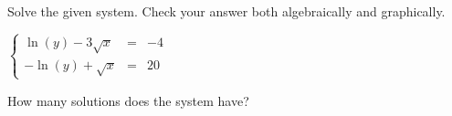 \documentclass{ximera}
\author{Kenneth Berglund}
\begin{document}
Solve the given system. Check your answer both algebraically and graphically.

$\left\{ \begin{array}{rcr} \ln(y) -3\sqrt{x} & = & -4 \\ -\ln(y) + \sqrt{x}  & = & 20  \end{array} \right.$

\begin{exercise}
How many solutions does the system have?
\begin{multipleChoice}  
\end{multipleChoice}  
\end{exercise}
\end{document}
